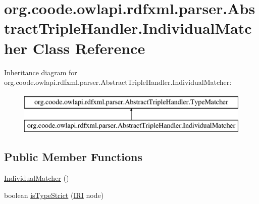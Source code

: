 \hypertarget{classorg_1_1coode_1_1owlapi_1_1rdfxml_1_1parser_1_1_abstract_triple_handler_1_1_individual_matcher}{\section{org.\-coode.\-owlapi.\-rdfxml.\-parser.\-Abstract\-Triple\-Handler.\-Individual\-Matcher Class Reference}
\label{classorg_1_1coode_1_1owlapi_1_1rdfxml_1_1parser_1_1_abstract_triple_handler_1_1_individual_matcher}
}
Inheritance diagram for org.\-coode.\-owlapi.\-rdfxml.\-parser.\-Abstract\-Triple\-Handler.\-Individual\-Matcher\-:\begin{figure}[H]
\begin{center}
\leavevmode
\includegraphics[height=2.000000cm]{classorg_1_1coode_1_1owlapi_1_1rdfxml_1_1parser_1_1_abstract_triple_handler_1_1_individual_matcher}
\end{center}
\end{figure}
\subsection*{Public Member Functions}
\begin{DoxyCompactItemize}
\item 
\hyperlink{classorg_1_1coode_1_1owlapi_1_1rdfxml_1_1parser_1_1_abstract_triple_handler_1_1_individual_matcher_a7b29362a4eb21328d5594383eb5471a1}{Individual\-Matcher} ()
\item 
boolean \hyperlink{classorg_1_1coode_1_1owlapi_1_1rdfxml_1_1parser_1_1_abstract_triple_handler_1_1_individual_matcher_a0e1f103a1c50800c8b3999de82ed7ccd}{is\-Type\-Strict} (\hyperlink{classorg_1_1semanticweb_1_1owlapi_1_1model_1_1_i_r_i}{I\-R\-I} node)
\end{DoxyCompactItemize}


